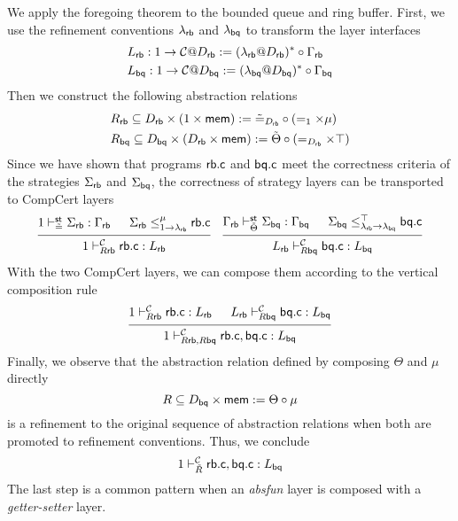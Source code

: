 \documentclass[acmsmall,review,anonymous]{acmart}\settopmatter{printfolios=true,printccs=false,printacmref=false}
\begin{document}
\begin{example}
  We apply the foregoing theorem
  to the bounded queue and ring buffer.
  First, we use the refinement conventions
  $\lambda_{ \mathsf{rb} }$ and $\lambda_{ \mathsf{bq} }$
  to transform the layer interfaces
  \begin{align*}
    & L_{ \mathsf{rb} }: 1 \rightarrow \mathcal{C}@D_{ \mathsf{rb} }
      := (\lambda_{ \mathsf{rb} } @D_{ \mathsf{rb} })^* \circ \Gamma_{ \mathsf{rb} }\\
    & L_{ \mathsf{bq} }: 1 \rightarrow \mathcal{C}@D_{ \mathsf{bq} }
      := (\lambda_{ \mathsf{bq} } @D_{ \mathsf{bq} })^* \circ \Gamma_{ \mathsf{bq} }
  \end{align*}
  Then we construct the following abstraction relations
  \begin{align*}
    & R_{ \mathsf{rb} } \subseteq D_{ \mathsf{rb} } \times (1 \times  \mathsf{mem} )
      := \tilde{=}_{D_{ \mathsf{rb} }} \circ (=_1 \times \mu)\\
    & R_{ \mathsf{bq} } \subseteq D_{ \mathsf{bq} } \times (D_{ \mathsf{rb} } \times  \mathsf{mem} )
      := \tilde{\Theta} \circ (=_{D_{ \mathsf{rb} }} \times \top)
  \end{align*}
  Since we have shown that
  programs $ \mathsf{rb.c} $ and $ \mathsf{bq.c} $
  meet the correctness criteria
  of the strategies $\Sigma_{ \mathsf{rb} }$ and $\Sigma_{ \mathsf{bq} }$,
  the correctness of strategy layers
  can be transported to CompCert layers
  \[
    \begin{prooftree}
      \hypo{1 \vdash^\kw{st}_{\tilde{=}} \Sigma_\kw{rb} : \Gamma_\kw{rb}}
      \hypo{\Sigma_\kw{rb} \le^\mu_{1 \rightarrow \lambda_\kw{rb}} \kw{rb.c}}
      \infer2{1 \vdash^\mathcal{C}_{R\kw{rb}} \kw{rb.c}: L_\kw{rb}}
    \end{prooftree}
    \quad
    \begin{prooftree}
      \hypo{\Gamma_\kw{rb} \vdash^\kw{st}_{\tilde{\Theta}} \Sigma_\kw{bq} : \Gamma_\kw{bq}}
      \hypo{\Sigma_\kw{bq} \le^\top_{\lambda_\kw{rb} \rightarrow \lambda_\kw{bq}} \kw{bq.c}}
      \infer2{L_\kw{rb} \vdash^\mathcal{C}_{R\kw{bq}} \kw{bq.c}: L_\kw{bq}}
    \end{prooftree}
  \]
  With the two CompCert layers,
  we can compose them according to
  the vertical composition rule
  \[
    \begin{prooftree}
      \hypo{1 \vdash^\mathcal{C}_{R\kw{rb}} \kw{rb.c}: L_\kw{rb}}
      \hypo{L_\kw{rb} \vdash^\mathcal{C}_{R\kw{bq}} \kw{bq.c}: L_\kw{bq}}
      \infer2{1 \vdash^\mathcal{C}_{R\kw{rb}, R\kw{bq}}
        \kw{rb.c}, \kw{bq.c}: L_\kw{bq}}
    \end{prooftree}
  \]
  Finally, we observe that
  the abstraction relation defined by
  composing $\Theta$ and $\mu$ directly
  \[
    R \subseteq D_{ \mathsf{bq} } \times  \mathsf{mem} 
    := \Theta \circ \mu
  \]
  is a refinement to
  the original sequence of abstraction relations
  when both are promoted to
  refinement conventions.
  Thus, we conclude
  \[
    1 \vdash^\mathcal{C}_{\tilde{R}}
         \mathsf{rb.c} ,  \mathsf{bq.c} : L_{ \mathsf{bq} }
  \]
  The last step is a common pattern
  when an \emph{absfun} layer
  is composed with a \emph{getter-setter} layer.
\end{example}
\end{document}
